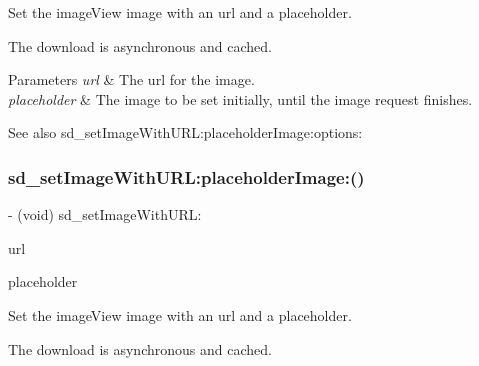 Set the image\+View {\ttfamily image} with an {\ttfamily url} and a placeholder.

The download is asynchronous and cached.


\begin{DoxyParams}{Parameters}
{\em url} & The url for the image. \\
\hline
{\em placeholder} & The image to be set initially, until the image request finishes. \\
\hline
\end{DoxyParams}
\begin{DoxySeeAlso}{See also}
sd\+\_\+set\+Image\+With\+U\+R\+L\+:placeholder\+Image\+:options\+: 
\end{DoxySeeAlso}
\mbox{\label{category_u_i_image_view_07_web_cache_08_a82e4106ff7460eff97dae9b79a539c41}} 
\subsubsection{\texorpdfstring{sd\+\_\+set\+Image\+With\+U\+R\+L\+:placeholder\+Image\+:()}{sd\_setImageWithURL:placeholderImage:()}\hspace{0.1cm}{\footnotesize\ttfamily [2/3]}}
{\footnotesize\ttfamily -\/ (void) sd\+\_\+set\+Image\+With\+U\+R\+L\+: \begin{DoxyParamCaption}\item[{(N\+S\+U\+RL $\ast$)}]{url }\item[{placeholderImage:(U\+I\+Image $\ast$)}]{placeholder }\end{DoxyParamCaption}}

Set the image\+View {\ttfamily image} with an {\ttfamily url} and a placeholder.

The download is asynchronous and cached.


